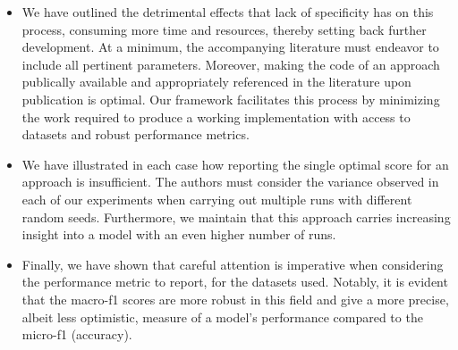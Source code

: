 \documentclass[../../fyp.tex]{subfiles}
\begin{document}
\begin{itemize}
	\item We have outlined the detrimental effects that lack of specificity has on this process, consuming more time and resources, thereby setting back further development. At a minimum, the accompanying literature must endeavor to include all pertinent parameters. Moreover, making the code of an approach publically available and appropriately referenced in the literature upon publication is optimal. Our framework facilitates this process by minimizing the work required to produce a working implementation with access to datasets and robust performance metrics.  
	\item We have illustrated in each case how reporting the single optimal score for an approach is insufficient. The authors must consider the variance observed in each of our experiments when carrying out multiple runs with different random seeds. Furthermore, we maintain that this approach carries increasing insight into a model with an even higher number of runs. 
	\item Finally, we have shown that careful attention is imperative when considering the performance metric to report, for the datasets used. Notably, it is evident that the macro-f1 scores are more robust in this field and give a more precise, albeit less optimistic, measure of a model's performance compared to the micro-f1 (accuracy).
\end{itemize}
\end{document}
